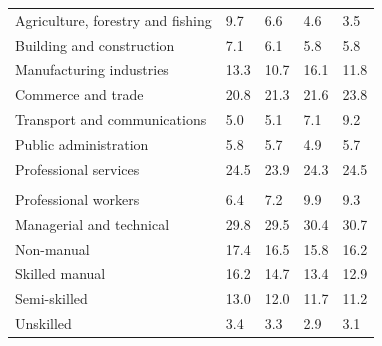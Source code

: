 \documentclass{article}
\begin{document}
\begin{table}[h]
\begin{tabular}{KTTTT}
    \hline
Agriculture, forestry and fishing  & 9.7& 6.6& 4.6& 3.5\\
Building and construction & 7.1& 6.1& 5.8& 5.8\\
Manufacturing industries & 13.3& 10.7& 16.1& 11.8\\
Commerce and trade  & 20.8& 21.3& 21.6& 23.8\\
Transport and communications  & 5.0& 5.1& 7.1& 9.2\\
Public administration & 5.8& 5.7& 4.9& 5.7\\
Professional services & 24.5& 23.9& 24.3& 24.5\\
\hline
    \\ 
    \hline
Professional workers  & 6.4& 7.2 & 9.9& 9.3\\
Managerial and technical & 29.8& 29.5& 30.4& 30.7\\
Non-manual & 17.4& 16.5& 15.8& 16.2\\
Skilled manual & 16.2& 14.7& 13.4& 12.9\\
Semi-skilled & 13.0& 12.0& 11.7& 11.2\\
Unskilled  & 3.4& 3.3& 2.9& 3.1\\
\end{tabular}
\end{table}
\pagebreak
\end{document}
